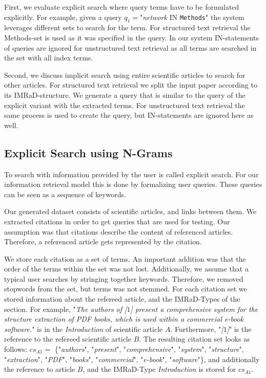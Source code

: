 First, we evaluate explicit search where query terms have to be formulated explicitly. For example, given a query $q_1=$"\textit{network} IN \texttt{Methods}" the system leverages different sets to search for the term. For structured text retrieval the Methods-set is used as it was specified in the query. In our system IN-statements of queries are ignored for unstructured text retrieval as all terms are searched in the set with all index terms.

Second, we discuss implicit search using entire scientific articles to search for other articles. For structured text retrieval we split the input paper according to its IMRaD-structure. We generate a query that is similar to the query of the explicit variant with the extracted terms. For unstructured text retrieval the same process is used to create the query, but IN-statements are ignored here as well.

\subsection{Explicit Search using N-Grams}

To search with information provided by the user is called explicit search. For our information retrieval model this is done by formalizing user queries. These queries can be seen as a sequence of keywords.

Our generated dataset consists of scientific articles, and links between them. We extracted citations in order to get queries that are used for testing. Our assumption was that citations describe the content of referenced articles. Therefore, a referenced article gets represented by the citation.

We store each citation as a set of terms. An important addition was that the order of the terms within the set was not lost. Additionally, we assume that a typical user searches by stringing together keywords. Therefore, we removed stopwords from the set, but terms was not stemmed. For each citation set we stored information about the refereed article, and the IMRaD-Types of the section. For example, "\textit{The authors of [$1$] present a comprehensive system for the structure extraction of PDF books, which is used within a commercial e-book software.}" is in the \textit{Introduction} of scientific article $A$. Furthermore, "\textit{[$1$]}" is the reference to the refereed scientific article $B$. The resulting citation set looks as follows: $cs_{A1} =$ \{"\textit{authors}", "\textit{present}", "\textit{comprehensive}", "\textit{system}", "\textit{structure}", "\textit{extraction}", "\textit{PDF}", "\textit{books}", "\textit{commercial}", "\textit{e-book}", "\textit{software}"\}, and additionally the reference to article $B$, and the IMRaD-Type \textit{Introduction} is stored for $cs_{A1}$.

